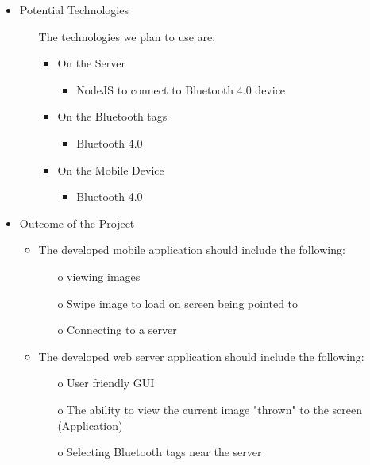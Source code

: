 \begin{itemize}
	\item Potential Technologies
	\begin{itemize}
		\item[] The technologies we plan to use are:
		\begin{itemize}
			\item On the Server
			\begin{itemize}
				\item NodeJS to connect to Bluetooth 4.0 device
			\end{itemize}
			\item On the Bluetooth tags
			\begin{itemize}
				\item Bluetooth 4.0 
			\end{itemize}
			\item On the Mobile Device
			\begin{itemize}
				\item Bluetooth 4.0
				
			\end{itemize}
		\end{itemize}
	\end{itemize}
	
	\item Outcome of the Project
	\begin{itemize}
		\item The developed mobile application should include the following:
		\begin{itemize}
			\item[o] viewing images
			\item[o] Swipe image to load on screen being pointed to
			\item[o] Connecting to a server
			
		\end{itemize}
		
		\item The developed web server application should include the following:
		\begin{itemize}
			\item [o] User friendly GUI
			\item [o] The ability to view the current image "thrown" to the screen (Application)
			\item[o] Selecting Bluetooth tags near the server
		\end{itemize}
	\end{itemize}
	
\end{itemize}
